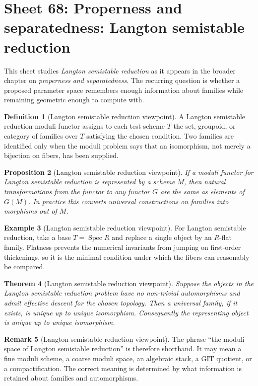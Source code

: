 \documentclass[11pt]{amsart}
\newtheorem{theorem}{Theorem}[section]
\newtheorem{proposition}[theorem]{Proposition}
\theoremstyle{definition}
\newtheorem{definition}[theorem]{Definition}
\newtheorem{example}[theorem]{Example}
\newtheorem{remark}[theorem]{Remark}
\newcommand{\Spec}{\operatorname{Spec}}
\begin{document}
\section{Sheet 68: Properness and separatedness: Langton semistable reduction}
This sheet studies \emph{Langton semistable reduction} as it appears in the broader chapter on \emph{properness and separatedness}.  The recurring question is whether a proposed parameter space remembers enough information about families while remaining geometric enough to compute with.
\begin{definition}[Langton semistable reduction viewpoint]
A Langton semistable reduction moduli functor assigns to each test scheme $T$ the set, groupoid, or category of families over $T$ satisfying the chosen condition.  Two families are identified only when the moduli problem says that an isomorphism, not merely a bijection on fibers, has been supplied.
\end{definition}
\begin{proposition}[Langton semistable reduction viewpoint]
If a moduli functor for Langton semistable reduction is represented by a scheme $M$, then natural transformations from the functor to any functor $G$ are the same as elements of $G(M)$.  In practice this converts universal constructions on families into morphisms out of $M$.
\end{proposition}
\begin{example}[Langton semistable reduction viewpoint]
For Langton semistable reduction, take a base $T=\Spec R$ and replace a single object by an $R$-flat family.  Flatness prevents the numerical invariants from jumping on first-order thickenings, so it is the minimal condition under which the fibers can reasonably be compared.
\end{example}
\begin{theorem}[Langton semistable reduction viewpoint]
Suppose the objects in the Langton semistable reduction problem have no non-trivial automorphisms and admit effective descent for the chosen topology.  Then a universal family, if it exists, is unique up to unique isomorphism.  Consequently the representing object is unique up to unique isomorphism.
\end{theorem}
\begin{remark}[Langton semistable reduction viewpoint]
The phrase ``the moduli space of Langton semistable reduction'' is therefore shorthand.  It may mean a fine moduli scheme, a coarse moduli space, an algebraic stack, a GIT quotient, or a compactification.  The correct meaning is determined by what information is retained about families and automorphisms.
\end{remark}
\end{document}

